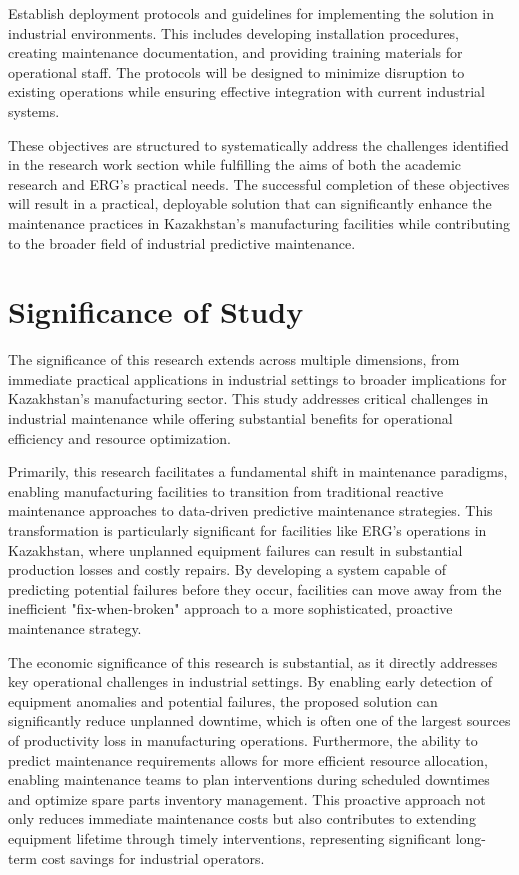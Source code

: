 Establish deployment protocols and guidelines for implementing the solution in industrial environments. This includes developing installation procedures, creating maintenance documentation, and providing training materials for operational staff. The protocols will be designed to minimize disruption to existing operations while ensuring effective integration with current industrial systems.

These objectives are structured to systematically address the challenges identified in the research work section while fulfilling the aims of both the academic research and ERG's practical needs. The successful completion of these objectives will result in a practical, deployable solution that can significantly enhance the maintenance practices in Kazakhstan's manufacturing facilities while contributing to the broader field of industrial predictive maintenance.

\section{Significance of Study}
The significance of this research extends across multiple dimensions, from immediate practical applications in industrial settings to broader implications for Kazakhstan's manufacturing sector. This study addresses critical challenges in industrial maintenance while offering substantial benefits for operational efficiency and resource optimization.

Primarily, this research facilitates a fundamental shift in maintenance paradigms, enabling manufacturing facilities to transition from traditional reactive maintenance approaches to data-driven predictive maintenance strategies. This transformation is particularly significant for facilities like ERG's operations in Kazakhstan, where unplanned equipment failures can result in substantial production losses and costly repairs. By developing a system capable of predicting potential failures before they occur, facilities can move away from the inefficient "fix-when-broken" approach to a more sophisticated, proactive maintenance strategy.

The economic significance of this research is substantial, as it directly addresses key operational challenges in industrial settings. By enabling early detection of equipment anomalies and potential failures, the proposed solution can significantly reduce unplanned downtime, which is often one of the largest sources of productivity loss in manufacturing operations. Furthermore, the ability to predict maintenance requirements allows for more efficient resource allocation, enabling maintenance teams to plan interventions during scheduled downtimes and optimize spare parts inventory management. This proactive approach not only reduces immediate maintenance costs but also contributes to extending equipment lifetime through timely interventions, representing significant long-term cost savings for industrial operators.

